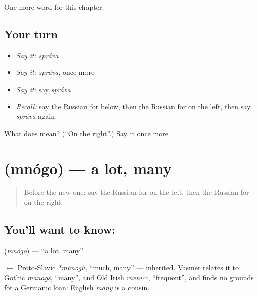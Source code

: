 \begin{grammarlens}[title={What you've built}]
One more word for this chapter.
\end{grammarlens}

\subsection*{Your turn}
\begin{itemize}
\raggedright
  \item \emph{Say it:} \emph{správa}
  \item \emph{Say it:} \emph{správa}, once more
  \item \emph{Say it:} say \emph{správa}
  \item \emph{Recall:} say the Russian for below, then the Russian for on the left, then say \emph{správa} again
\end{itemize}

\begin{tcolorbox}[breakable,colback=teal!4,colframe=teal!35!black,title={Before you move on}]
What does  mean? (\textquotedblleft{}On the right\textquotedblright{}.) Say it once more.
\end{tcolorbox}
\section[\texorpdfstring{\ru{много} (mnógo)}{много (mnógo)}]{ (mnógo) — a lot, many}

\label{lesson:RU-C73-alot}



\begin{quote}
Before the new one: say the Russian for on the left, then the Russian for on the right.
\end{quote}

\subsection*{You'll want to know: }
\textbf{} (\emph{mnógo}) — \textquotedblleft{}a lot, many\textquotedblright{}.

\begin{cousinweb}
\textbf{} $\leftarrow$ Proto-Slavic \emph{*mŭnogŭ}, \textquotedblleft{}much, many\textquotedblright{} — inherited. Vasmer relates it to Gothic \emph{manags}, \textquotedblleft{}many\textquotedblright{}, and Old Irish \emph{menicc}, \textquotedblleft{}frequent\textquotedblright{}, and finds no grounds for a Germanic loan: English \emph{many} is a cousin.
\end{cousinweb}

